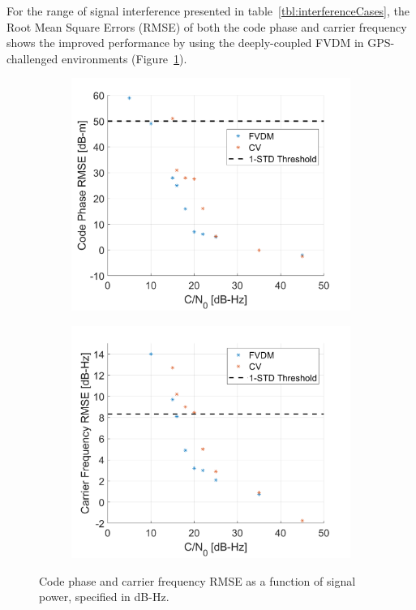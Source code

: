 For the range of signal interference presented in table~\ref{tbl:interferenceCases}, the Root Mean Square Errors (RMSE) of both the code phase and carrier frequency shows the improved performance by using the deeply-coupled FVDM in GPS-challenged environments (Figure~\ref{fig:codecarrierstraight}).

\begin{figure}[!ht]
    \begin{subfigure}{.45\textwidth}
        \centering
        \includegraphics[width=1\linewidth]{Figures/straight/codephaseRMSEstraight.png}
    \end{subfigure}%
    \begin{subfigure}{.45\textwidth}
        \centering
        \includegraphics[width=1\linewidth]{Figures/straight/carrFreqRMSEstraight.png}
    \end{subfigure}
    \caption{Code phase and carrier frequency RMSE as a function of signal power, specified in dB-Hz.}\label{fig:codecarrierstraight}
\end{figure}

